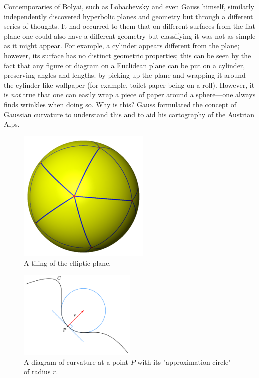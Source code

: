 \begin{multicols}{2}
Contemporaries of Bolyai, such as Lobachevsky and even Gauss himself, similarly independently discovered hyperbolic planes and geometry but through a different series of thoughts. It had occurred to them that on different surfaces from the flat plane one could also have a different geometry but classifying it was not as simple as it might appear. For example, a cylinder appears different from the plane; however, its surface has no distinct geometric properties; this can be seen by the fact that any figure or diagram on a Euclidean plane can be put on a cylinder, preserving angles and lengths. by picking up the plane and wrapping it around the cylinder like wallpaper (for example, toilet paper being on a roll). However, it is \textit{not} true that one can easily wrap a piece of paper around a sphere---one always finds wrinkles when doing so. Why is this? Gauss formulated the concept of Gaussian curvature to understand this and to aid his cartography of the Austrian Alps.

\end{multicols}

\begin{figure}[h]
\centering
\includegraphics[scale=1]{Fig11}
\caption{A tiling of the elliptic plane.} 
\end{figure}

\begin{figure}[h]
\centering
\includegraphics[width=0.5\textwidth]{Fig21}
\caption{A diagram of curvature at a point \(P\) with its "approximation circle" of radius \(r\).} 
\end{figure}

